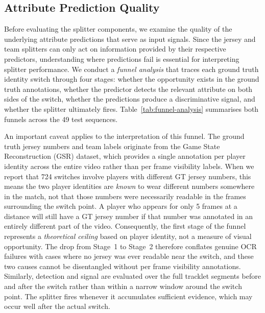 \subsection{Attribute Prediction Quality}
\label{sec:attribute-prediction-quality}

Before evaluating the splitter components, we examine the quality of the underlying attribute predictions that serve as input signals. Since the jersey and team splitters can only act on information provided by their respective predictors, understanding where predictions fail is essential for interpreting splitter performance. We conduct a \emph{funnel analysis} that traces each ground truth identity switch through four stages: whether the opportunity exists in the ground truth annotations, whether the predictor detects the relevant attribute on both sides of the switch, whether the predictions produce a discriminative signal, and whether the splitter ultimately fires. Table~\ref{tab:funnel-analysis} summarises both funnels across the 49 test sequences.

An important caveat applies to the interpretation of this funnel. The ground truth jersey numbers and team labels originate from the Game State Reconstruction (GSR) dataset, which provides a single annotation per player identity across the entire video rather than per frame visibility labels. When we report that 724 switches involve players with different GT jersey numbers, this means the two player identities are \emph{known} to wear different numbers somewhere in the match, not that those numbers were necessarily readable in the frames surrounding the switch point. A player who appears for only 5 frames at a distance will still have a GT jersey number if that number was annotated in an entirely different part of the video. Consequently, the first stage of the funnel represents a \emph{theoretical ceiling} based on player identity, not a measure of visual opportunity. The drop from Stage~1 to Stage~2 therefore conflates genuine OCR failures with cases where no jersey was ever readable near the switch, and these two causes cannot be disentangled without per frame visibility annotations. Similarly, detection and signal are evaluated over the full tracklet segments before and after the switch rather than within a narrow window around the switch point. The splitter fires whenever it accumulates sufficient evidence, which may occur well after the actual switch.

